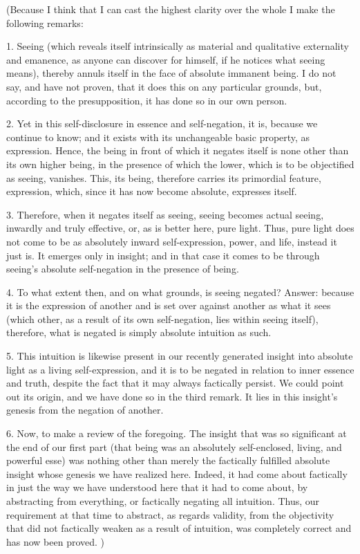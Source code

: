(Because I think that I can cast
the highest clarity over the whole
I make the following remarks:

1. Seeing
(which reveals itself intrinsically
as material and qualitative externality and emanence,
as anyone can discover for himself,
if he notices what seeing means),
thereby annuls itself in the face
of absolute immanent being.
I do not say, and have not proven,
that it does this on any particular grounds,
but, according to the presupposition,
it has done so in our own person.

2.  Yet in this self-disclosure
in essence and self-negation,
it is, because we continue to know;
and it exists with its unchangeable basic property,
as expression.
Hence, the being in front of which
it negates itself is none other
than its own higher being,
in the presence of which the lower,
which is to be objectified as seeing, vanishes.
This, its being, therefore carries its
primordial feature, expression,
which, since it has now become absolute,
expresses itself.

3. Therefore, when it negates itself as seeing,
seeing becomes actual seeing,
inwardly and truly effective,
or, as is better here, pure light.
Thus, pure light does not come to be as
absolutely inward self-expression, power, and life,
instead it just is.
It emerges only in insight;
and in that case it comes to be
through seeing’s absolute self-negation
in the presence of being.

4. To what extent then,
and on what grounds,
is seeing negated?
Answer: because it is the expression of another
and is set over against another as what it sees
(which other, as a result of its own self-negation,
lies within seeing itself),
therefore, what is negated is
simply absolute intuition as such.

5. This intuition is likewise present
in our recently generated insight into
absolute light as a living self-expression,
and it is to be negated in relation to
inner essence and truth,
despite the fact that it may
always factically persist.
We could point out its origin,
and we have done so in the third remark.
It lies in this insight’s genesis
from the negation of another.

6. Now, to make a review of the foregoing.
The insight that was so significant
at the end of our first part
(that being was an absolutely
self-enclosed, living, and powerful esse)
was nothing other than merely
the factically fulfilled absolute insight
whose genesis we have realized here.
Indeed, it had come about factically
in just the way we have understood
here that it had to come about,
by abstracting from everything,
or factically negating all intuition.
Thus, our requirement at that time to abstract,
as regards validity, from the objectivity
that did not factically weaken as a result of intuition,
was completely correct and has now been proved.
)

